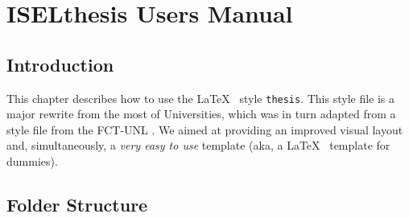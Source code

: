 % 
%  
%
\chapter{ISELthesis Users Manual}
\label{cha:users_manual}

\section{Introduction} %
\label{sec:introduction}

This chapter describes how to use the \LaTeX~ style \texttt{thesis{}}. This style file is a major rewrite from the most of Universities, which was in turn adapted from a style file from the FCT-UNL \cite{novathesis-manual}.  We aimed at providing an improved visual layout and, simultaneously, a \emph{very easy to use} template (aka, a  \LaTeX~ template for dummies). 


\section{Folder Structure} %
\label{sec:folder_structure}

